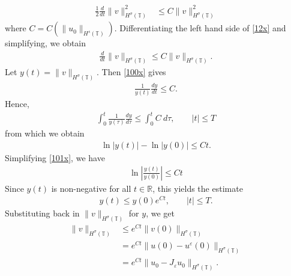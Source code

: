 \documentclass[12pt,reqno]{amsart}
\newcommand{\rr}{\mathbb{R}}
\newcommand{\ci}{\mathbb{T}}
\newcommand{\ee}{\varepsilon}
\theoremstyle{plain}  %
\theoremstyle{definition}
\begin{document}
\begin{appendices}
\begin{equation}
\begin{split}
		\frac{1}{2}\frac{d}{dt} \|v\|_{H^{\sigma}(\ci)}^2
		& \le
	 C \|v\|_{H^{\sigma}(\ci)}^2
\end{split}
\end{equation}
where $C = C(\|u_0\|_{H^s(\ci)})$. Differentiating the left hand side of
\eqref{12x} and simplifying, we obtain
\begin{equation}
	\begin{split}
		\frac{d}{dt}\|v\|_{H^{\sigma}(\ci)} \le C \|v\|_{H^{\sigma}(\ci)}.
		\label{100x}
	\end{split}
\end{equation}
Let $y(t) = \|v\|_{H^{\sigma}(\ci)}$. Then \eqref{100x} gives
\begin{equation*}
	\begin{split}
		\frac{1}{y(t)}\frac{dy}{dt} \le C.
	\end{split}
\end{equation*}
Hence,
\begin{equation*}
	\begin{split}
		\int_0^t \frac{1}{y(\tau)} \frac{dy}{d \tau}
		\le \int_0^t C \ d \tau, \qquad |t| \le T
	\end{split}
\end{equation*}
from which we obtain
\begin{equation}
	\begin{split}
		\ln |y(t) | - \ln |y(0)| \le C t.
		\label{101x}
	\end{split}
\end{equation}
Simplifying \eqref{101x}, we have
\begin{equation*}
	\begin{split}
		\ln \left |\frac{y(t)}{y(0)} \right | \le C t
	\end{split}
\end{equation*}
Since $y(t)$ is non-negative for all $t \in \rr$, this yields the estimate
\begin{equation*}
	\begin{split}
		y(t) \le y(0) e^{C t}, \qquad |t| \le T.
	\end{split}
\end{equation*}
Substituting back in $\|v\|_{H^{\sigma}(\ci)}$ for $y$, we get
\begin{equation}
	\label{conc-lemma}
	\begin{split}
		\|v\|_{H^{\sigma}(\ci)}
		& \le e^{C t}\|v(0)\|_{H^{\sigma}(\ci)}
		\\
		& = e^{C t}\|u(0) - u^\ee(0) \|_{H^{\sigma}(\ci)}
		\\
		& = e^{C t}\|u_0 - J_\ee u_0 \|_{H^{\sigma}(\ci)}.

\end{split}
\end{equation}
\end{appendices}
\end{document}
